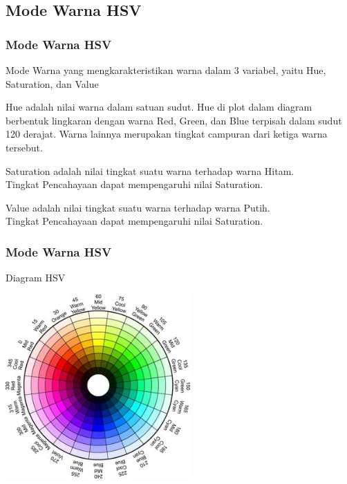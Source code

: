 \documentclass[table,dvipsnames]{beamer}
\begin{document}
\subsection{Mode Warna HSV}

\begin{frame}
\frametitle{Mode Warna HSV}
\begin{block}{}
Mode Warna yang mengkarakteristikan warna dalam 3 variabel, yaitu Hue, Saturation, dan Value
\end{block}
\begin{block}{}
Hue adalah nilai warna dalam satuan sudut.
Hue di plot dalam diagram berbentuk lingkaran dengan warna Red, Green, dan Blue terpisah dalam sudut 120 derajat.
Warna lainnya merupakan tingkat campuran dari ketiga warna tersebut.
\end{block}
\begin{block}{}
Saturation adalah nilai tingkat suatu warna terhadap warna Hitam.\\
Tingkat Pencahayaan dapat mempengaruhi nilai Saturation.
\end{block}
\begin{block}{}
Value adalah nilai tingkat suatu warna terhadap warna Putih.\\
Tingkat Pencahayaan dapat mempengaruhi nilai Saturation.
\end{block}
\end{frame}

\begin{frame}
\frametitle{Mode Warna HSV}
\begin{block}{Diagram HSV}
\begin{center}
 \includegraphics[width=200pt]{./tinjauan_teori/hsv/HSV}
\end{center}
\end{block}
\end{frame}
\end{document}
